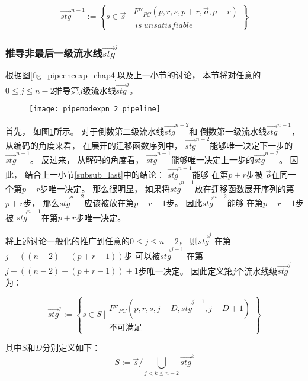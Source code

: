 \begin{equation}\label{stgn_1}
 \vec{stg}^{n-1} :=
\left\{
 s\in \vec{s} ~|
\begin{array}{cc}
 F''_{PC}(p,r,
 s,p+r,
 \vec{o},p+r)\\
 ~is~unsatisfiable
\end{array}
\right\}
\end{equation}

\subsubsection{推导非最后一级流水线$\vec{stg}^{j}$}

根据图\ref{fig_pipeencexp_chap4}以及上一小节的讨论，
本节将对任意的$0\le j\le n-2$推导第$j$级流水线$\vec{stg}^{j}$。



\begin{figure}[t]
\begin{center}
\texttt{[image: pipemodexpn\_2\_pipeline]}
\end{center}
\caption{}
  \label{fig_pipemodexpn_2_pipeline}
\end{figure}

首先，
如图\ref{fig_pipemodexpn_2_pipeline}所示。
对于倒数第二级流水线$\vec{stg}^{n-2}$和
倒数第一级流水线$\vec{stg}^{n-1}$，
从编码的角度来看，
在展开的迁移函数序列中，
$\vec{stg}^{n-2}$能够唯一决定下一步的$\vec{stg}^{n-1}$。
反过来，
从解码的角度看，
$\vec{stg}^{n-1}$能够唯一决定上一步的$\vec{stg}^{n-2}$。
因此，
结合上一小节\ref{subsub_last}中的结论：
$\vec{stg}^{n-1}$能够
在第$p+r$步被
$\vec{o}$在同一个第$p+r$步唯一决定。
那么很明显，
如果将$\vec{stg}^{n-1}$放在迁移函数展开序列的第$p+r$步，
那么$\vec{stg}^{n-2}$应该被放在第$p+r-1$步。
因此$\vec{stg}^{n-2}$能够
在第$p+r-1$步被
$\vec{stg}^{n-1}$在第$p+r$步唯一决定。

将上述讨论一般化的推广到任意的$0\le j\le n-2$，
则$\vec{stg}^j$ 在第$j-((n-2)-(p+r-1))$步
可以被$\vec{stg}^{j+1}$ 在第$j-((n-2)-(p+r-1))+1$步唯一决定。
因此定义第$j$个流水线级$\vec{stg}^j$ 为：

\begin{equation}\label{stgn_j}
\vec{stg}^{j} :=
 \left\{
 s\in S ~|
\begin{array}{cc}
 F''_{PC}(p,r,s,j-D,\vec{stg}^{j+1},j-D+1)\\
不可满足
\end{array}
\right\}
\end{equation}

其中$S$和$D$分别定义如下：
\begin{equation}\label{stgnS_def_chap4}
S              :=  \vec{s}/\bigcup_{j<k\le n-2}\vec{stg}^{k}
\end{equation}

